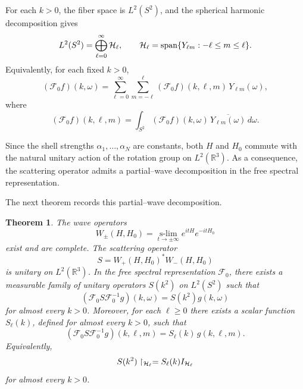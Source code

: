 \documentclass[a4paper,11pt]{article}
\numberwithin{equation}{section}
\newcommand{\R}{\mathbb{R}}
\newcommand{\slim}{\operatorname*{s-lim}}
\newtheorem{thm}{Theorem}[section]
\theoremstyle{definition}
\theoremstyle{remark}
\begin{document}
For each $k>0$, the fiber space is $L^2(S^2)$, and the spherical harmonic
decomposition gives
$$
L^2(S^2)
=
\bigoplus_{\ell=0}^\infty {\cal H}_\ell,
\qquad
{\cal H}_\ell
=
\operatorname{span}\{Y_{\ell m}:-\ell\le m\le\ell\}.
$$
Equivalently, for each fixed $k>0$,
$$
(\mathcal F_0 f)(k,\omega)
=
\sum_{\ell=0}^\infty\sum_{m=-\ell}^{\ell}
(\mathcal F_0 f)(k,\ell,m)\,Y_{\ell m}(\omega),
$$
where
$$
(\mathcal F_0 f)(k,\ell,m)
=
\int_{S^2}(\mathcal F_0 f)(k,\omega)\,
\overline{Y_{\ell m}(\omega)}\,d\omega.
$$

Since the shell strengths $\alpha_1,\ldots,\alpha_N$ are constants, both $H$
and $H_0$ commute with the natural unitary action of the rotation group on
$L^2(\R^3)$. As a consequence, the scattering operator admits a partial--wave
decomposition in the free spectral representation. 

The next theorem records this partial--wave decomposition.

\begin{thm}\label{thm:wave}
The wave operators
$$
W_\pm(H,H_0)
=
\slim_{t\to\pm\infty} e^{itH}e^{-itH_0}
$$
exist and are complete. The scattering operator
$$
S=W_+(H,H_0)^*W_-(H,H_0)
$$
is unitary on $L^2(\R^3)$.
In the free spectral representation $\mathcal F_0$,
there exists a measurable family of unitary operators $S(k^2)$ on $L^2(S^2)$
such that
$$
(\mathcal F_0 S\mathcal F_0^{-1}g)(k,\omega)=S(k^2)g(k,\omega)
$$
for almost every $k>0$. Moreover, for each $\ell\ge0$ there exists a scalar
function $S_\ell(k)$, defined for almost every $k>0$, such that
\begin{equation}\label{eq:Sdiag}
(\mathcal F_0 S\mathcal F_0^{-1}g)(k,\ell,m)
=
S_\ell(k)\,g(k,\ell,m).
\end{equation}
Equivalently,
$$
S(k^2)\upharpoonright_{{\cal H}_\ell}=S_\ell(k)I_{{\cal H}_\ell}
$$
for almost every $k>0$.
\end{thm}
\end{document}
